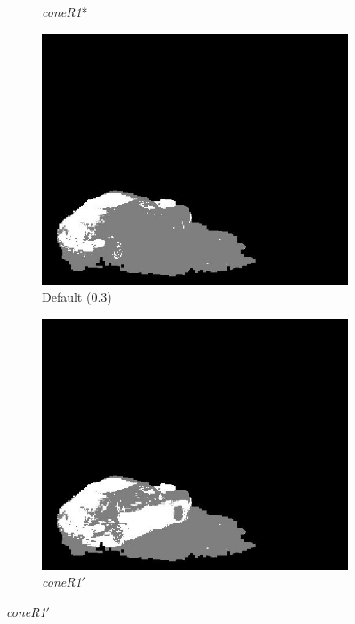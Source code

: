 \begin{figure}
\begin{subfigure}{.24\linewidth}
  \caption{\textit{coneR1}*}
  \end{subfigure}
  \hfill
  \begin{subfigure}{.24\linewidth}
  \includegraphics[width=1\linewidth]{figures/model/campus_0061_default.jpg}
  \caption{Default (0.3)}
  \end{subfigure}
  \hfill
  \begin{subfigure}{.24\linewidth}
  \includegraphics[width=1\linewidth]{figures/model/campus_0061_calc.jpg}
  \caption{\textit{coneR1}$'$}
  \end{subfigure}

\end{figure}
